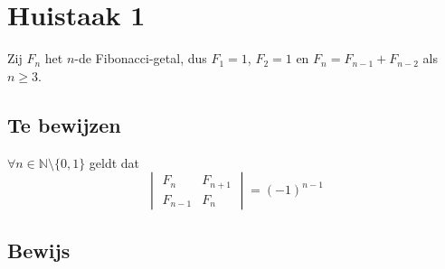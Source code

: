 \documentclass[lineaire_algebra_oplossingen.tex]{subfiles}
\begin{document}
\section{Huistaak 1}

Zij $F_{n}$ het $n$-de Fibonacci-getal, dus $F_{1}=1$, $F_{2}=1$ en $F_{n}=F_{n-1}+F_{n-2}$ als $n \ge 3$.
\subsection*{Te bewijzen}
$\forall n \in \mathbb{N}\setminus\{0,1\}$ geldt dat
\[
\begin{vmatrix}
F_{n}   & F_{n+1}\\
F_{n-1} & F_{n}
\end{vmatrix}
=
(-1)^{n-1}
\]
\subsection*{Bewijs}
\end{document}

